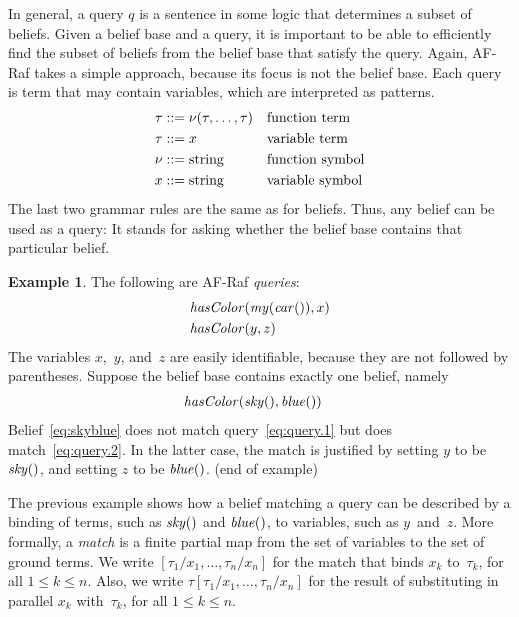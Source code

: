 \documentclass[a4paper,12pt,oneside,fleqn]{book} %
\theoremstyle{plain}
\theoremstyle{definition}
\newtheorem{example}{Example}
\theoremstyle{remark}
\newcommand{\eox}[1]{\hskip5mm\null\nobreak\hfill#1}
\newcommand{\eoe}{\eox{(end of example)}}
\begin{document}
In general, a query $q$ is a sentence in some logic that determines a
subset of beliefs.  Given a belief base and a query, it is important to be
able to efficiently find the subset of beliefs from the belief base that
satisfy the query.  Again, AF-Raf takes a simple approach, because its
focus is not the belief base.  Each query is term that may contain
variables, which are interpreted as patterns.  \begin{align} \tau &::=
\nu(\tau,\ldots,\tau) && \text{function term} \\ \tau &::= x &&
\text{variable term} \\ \nu  &::= {\rm string} &&\text{function symbol} \\
x &::= {\rm string} && \text{variable symbol} \end{align} The last two
grammar rules are the same as for beliefs.  Thus, any belief can be used as
a query:  It stands for asking whether the belief base contains that
particular belief.

\begin{example} The following are AF-Raf \emph{queries}: \begin{align}
&{\it hasColor}({\it my}({\it car}()), x) \label{eq:query.1} \\ &{\it
hasColor}(y, z) \label{eq:query.2} \end{align} The variables $x$,~$y$,
and~$z$ are easily identifiable, because they are not followed by
parentheses.  Suppose the belief base contains exactly one belief, namely
\begin{align} &{\it hasColor}({\it sky}(), {\it blue}()) \label{eq:skyblue}
\end{align} Belief~\eqref{eq:skyblue} does not match
query~\eqref{eq:query.1} but does match~\eqref{eq:query.2}.  In the latter
case, the match is justified by setting $y$ to be ${\it sky}()$, and
setting $z$ to be ${\it blue}()$.  \eoe \end{example}

The previous example shows how a belief matching a query can be described
by a binding of terms, such as ${\it sky}()$ and ${\it blue}()$, to
variables, such as $y$~and~$z$.  More formally, a \emph{match} is a finite
partial map from the set of variables to the set of ground terms.  We write
$[\tau_1/x_1,\ldots,\tau_n/x_n]$ for the match that binds $x_k$
to~$\tau_k$, for all $1\le k\le n$.  Also, we write
$\tau[\tau_1/x_1,\ldots,\tau_n/x_n]$ for the result of substituting in
parallel $x_k$ with~$\tau_k$, for all $1\le k\le n$.
\end{document}
